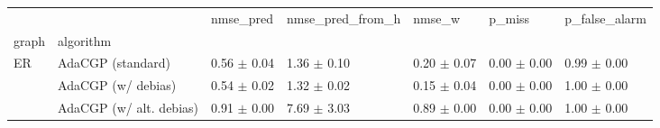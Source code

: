 \begin{tabular}{lllllll}
\toprule
   &                         &        nmse_pred & nmse_pred_from_h &           nmse_w &           p_miss &    p_false_alarm \\
graph & algorithm &                  &                  &                  &                  &                  \\
\midrule
ER & AdaCGP (standard) &  0.56 $\pm$ 0.04 &  1.36 $\pm$ 0.10 &  0.20 $\pm$ 0.07 &  0.00 $\pm$ 0.00 &  0.99 $\pm$ 0.00 \\
   & AdaCGP (w/ debias) &  0.54 $\pm$ 0.02 &  1.32 $\pm$ 0.02 &  0.15 $\pm$ 0.04 &  0.00 $\pm$ 0.00 &  1.00 $\pm$ 0.00 \\
   & AdaCGP (w/ alt. debias) &  0.91 $\pm$ 0.00 &  7.69 $\pm$ 3.03 &  0.89 $\pm$ 0.00 &  0.00 $\pm$ 0.00 &  1.00 $\pm$ 0.00 \\
\bottomrule
\end{tabular}
